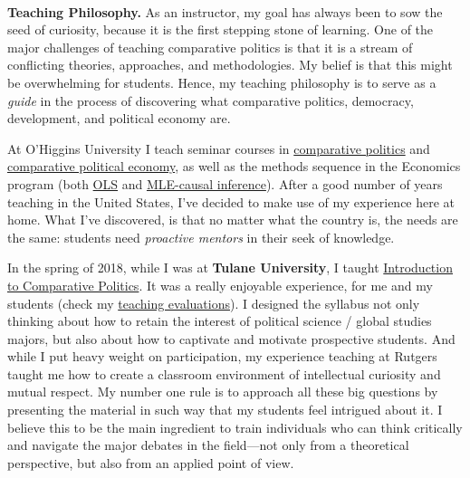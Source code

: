 \vspace{-2cm}{\bf \huge Teaching Statement}\\

{\bf Teaching Philosophy.} As an instructor, my goal has always been to sow the seed of curiosity, because it is the first stepping stone of learning. One of the major challenges of teaching comparative politics is that it is a stream of conflicting theories, approaches, and methodologies. My belief is that this might be overwhelming for students. Hence, my teaching philosophy is to serve as a \emph{guide} in the process of discovering what comparative politics, democracy, development, and political economy are.

At O'Higgins University I teach seminar courses in \href{https://github.com/hbahamonde/Ciencia_Politica_I/raw/master/Bahamonde_Ciencia_Politica_I.pdf}{comparative politics} and \href{https://github.com/hbahamonde/Ciencia_Politica_II/raw/master/Bahamonde_Ciencia_Politica_II.pdf}{comparative political economy}, as well as the methods sequence in the Economics program (both \href{https://github.com/hbahamonde/OLS/raw/master/Bahamonde_OLS.pdf}{OLS} and \href{https://github.com/hbahamonde/MLE/raw/master/Bahamonde_MLE.pdf}{MLE-causal inference}). After a good number of years teaching in the United States, I've decided to make use of my experience here at home. What I've discovered, is that no matter what the country is, the needs are the same: students need \emph{proactive mentors} in their seek of knowledge. 

In the spring of 2018, while I was at {\bf Tulane University}, I taught \href{https://github.com/hbahamonde/Comparative_Politics_UGRAD/raw/master/Bahamonde_Comparative_Politics_Syllabus_UGRAD.pdf}{Introduction to Comparative Politics}. It was a really enjoyable experience, for me and my students (check my \href{https://github.com/hbahamonde/Job_Market/raw/master/Bahamonde_Research_Portafolio.pdf}{teaching evaluations}). I designed the syllabus not only thinking about how to retain the interest of political science / global studies majors, but also about how to captivate and motivate prospective students. And while I put heavy weight on participation, my experience teaching at Rutgers taught me how to create a classroom environment of intellectual curiosity and mutual respect. My number one rule is to approach all these big questions by presenting the material in such way that my students feel intrigued about it. I believe this to be the main ingredient to train individuals who can think critically and navigate the major debates in the field---not only from a theoretical perspective, but also from an applied point of view.

